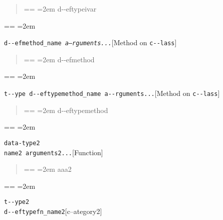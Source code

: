 \documentclass{book}
\makeatletter
\newenvironment{GNUTexinfopreformatted}{%
  \par\obeylines\obeyspaces\frenchspacing
  \parskip=\z@\parindent=\z@}{}
\makeatother
\begin{document}
%
\begin{quote}
\unskip{\parskip=0pt\noindent}%
\begin{GNUTexinfopreformatted}
\leftskip=2em\relax\ttfamily%
d{-}{-}eftypeivar
\end{GNUTexinfopreformatted}
\end{quote}
\begin{GNUTexinfopreformatted}
\leftskip=2em\relax\ttfamily%

\end{GNUTexinfopreformatted}
\noindent\texttt{d{-}{-}efmethod\_name \EmbracOn{}\textnormal{\textsl{a--rguments...}}\EmbracOff{}}\hfill[Method on \texttt{c{-}{-}lass}]

%
\begin{quote}
\unskip{\parskip=0pt\noindent}%
\begin{GNUTexinfopreformatted}
\leftskip=2em\relax\ttfamily%
d{-}{-}efmethod
\end{GNUTexinfopreformatted}
\end{quote}
\begin{GNUTexinfopreformatted}
\leftskip=2em\relax\ttfamily%

\end{GNUTexinfopreformatted}
\noindent\texttt{t{-}{-}ype d{-}{-}eftypemethod\_name a{-}{-}rguments...}\hfill[Method on \texttt{c{-}{-}lass}]

%
\begin{quote}
\unskip{\parskip=0pt\noindent}%
\begin{GNUTexinfopreformatted}
\leftskip=2em\relax\ttfamily%
d{-}{-}eftypemethod
\end{GNUTexinfopreformatted}
\end{quote}
\begin{GNUTexinfopreformatted}
\leftskip=2em\relax\ttfamily%


\end{GNUTexinfopreformatted}
\noindent\texttt{data-type2\leavevmode{}\\name2 arguments2...}\hfill[Function]

%
\begin{quote}
\unskip{\parskip=0pt\noindent}%
\begin{GNUTexinfopreformatted}
\leftskip=2em\relax\ttfamily%
aaa2
\end{GNUTexinfopreformatted}
\end{quote}
\begin{GNUTexinfopreformatted}
\leftskip=2em\relax\ttfamily%

\end{GNUTexinfopreformatted}
\noindent\texttt{t{-}{-}ype2\leavevmode{}\\d{-}{-}eftypefn\_name2}\hfill[c--ategory2]
\end{document}
